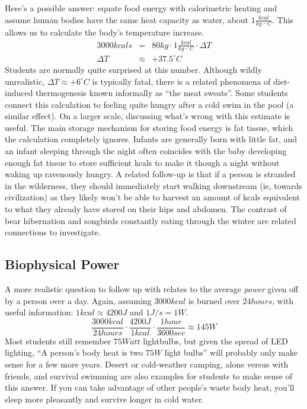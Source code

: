 \documentclass[prb,preprint]{revtex4-2}
\newcommand{\be}{\begin{equation}}
\newcommand{\ee}{\end{equation}}
\newcommand{\bea}{\begin{eqnarray}}
\newcommand{\eea}{\end{eqnarray}}
\newcommand{\degC}{^{\circ}C}
\begin{document}
Here's a possible answer:
equate food energy with calorimetric heating and assume human bodies have the same heat capacity as water, about $1\frac{kcal}{kg\cdot\degC}$. This allows us to calculate the body's temperature increase.
\bea
3000kcals &=& 80kg\cdot1 \frac{kcal}{kg\cdot \degC}\cdot\Delta T \nonumber \\
\Delta T &\approx& +37.5\degC \nonumber
\eea
Students are normally quite surprised at this number.  Although wildly unrealistic, $\Delta T \approx +6\degC$ is typically fatal, there is a related phenomena of diet-induced thermogenesis\cite{meat_sweats} known informally as ``the meat sweats''. Some students connect this calculation to feeling quite hungry after a cold swim in the pool (a similar effect).  On a larger scale, discussing what's wrong with this estimate is useful.  The main storage mechanism for storing food energy is fat tissue, which the calculation completely ignores.  Infants are generally born with little fat, and an infant sleeping through the night often coincides with the baby developing enough fat tissue to store sufficient kcals to make it though a night without waking up ravenously hungry.  A related follow-up is that if a person is stranded in the wilderness, they should immediately start walking downstream (ie, towards civilization) as they likely won't be able to harvest an amount of kcals equivalent to what they already have stored on their hips and abdomen.\cite{trout}  The contrast of bear hibernation \cite{fat_bear} and songbirds constantly eating through the winter are related connections to investigate.

\subsection{Biophysical Power}
A more realistic question to follow up with relates to the average \textit{power} given off by a person over a day.  
Again, assuming $3000kcal$ is burned over $24 hours$, with useful information: $1 kcal \approx 4200J$ and $1 J/s=1W$.
\be
\frac{3000kcal}{24hours}\cdot\frac{4200J}{1kcal}\cdot\frac{1hour}{3600sec}\approx145W
\ee
Most students still remember $75Watt$ lightbulbs, but given the spread of LED lighting, ``A person's body heat is two $75W$ light bulbs'' will probably only make sense for a few more years.  Desert or cold-weather camping, alone versus with friends, and survival swimming are also examples for students to make sense of this answer.  If you can take advantage of other people's waste body heat, you'll sleep more pleasantly and survive longer in cold water.  
\end{document}
